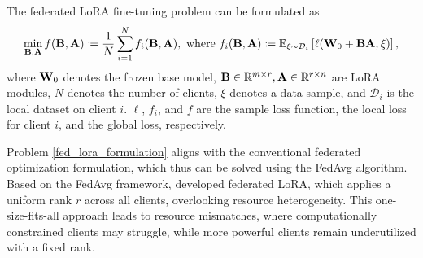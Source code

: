 \documentclass{article} %
\theoremstyle{plain}
\theoremstyle{definition}
\newcommand{\eqdef}{\coloneqq}
\begin{document}
The federated LoRA fine-tuning problem can be formulated as 
\vspace{-0.05in}
\begin{equation}\label{fed_lora_formulation}
\begin{aligned}
    \min_{\bf{B}, \bf{A}} f({\bf B},{\bf A}) \eqdef \frac{1}{N} \sum_{i=1}^{N} f_i({\bf B},{\bf A}), ~\text{where}~
    f_i({\bf B},{\bf A}) \eqdef  \mathbb{E}_{\xi \sim \mathcal{D}_i} \left[ \ell ({\bf W}_{0} + {\bf B} {\bf A}, \xi)\right],
\end{aligned}
\end{equation}
where \({\bf W}_{0}\) denotes the frozen base model, ${\bf B} \in \mathbb{R}^{m\times r},  {\bf A}\in \mathbb{R}^{r\times n}$ are LoRA modules, \(N\) denotes the number of clients, \(\xi\) denotes a data sample, and \(\mathcal{D}_i\) is the local dataset on client \(i\). 
\(\ell\), \(f_i\), and \(f\) are the sample loss function, the local loss for client \(i\), and the global loss, respectively. 

Problem \eqref{fed_lora_formulation} aligns with the conventional federated optimization formulation, which thus can be solved using the FedAvg algorithm. 
Based on the FedAvg framework, \citet{zhang2024towards} developed federated LoRA, which applies a uniform rank \(r\) across all clients, overlooking resource heterogeneity. 
This one-size-fits-all approach leads to resource mismatches, where computationally constrained clients may struggle, while more powerful clients remain underutilized with a fixed rank.
\end{document}
